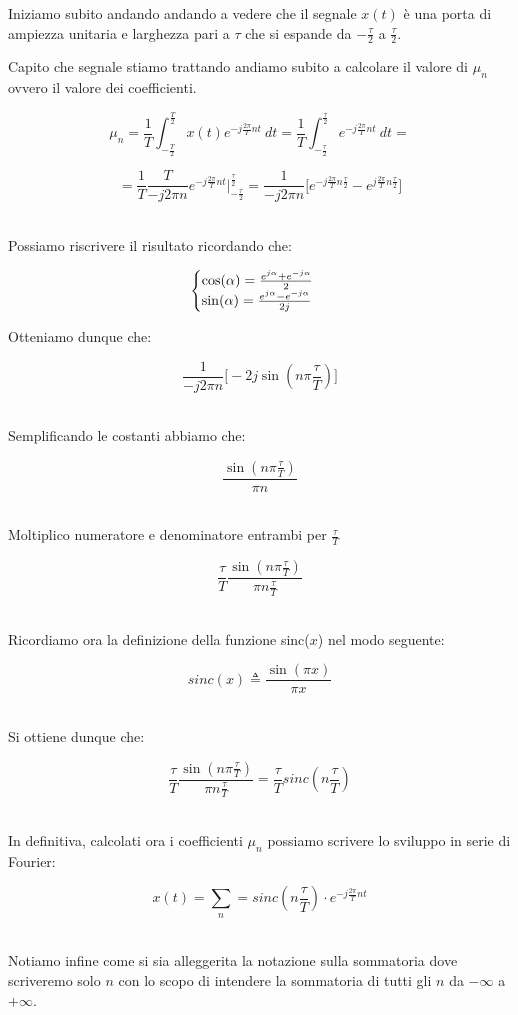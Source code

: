 \documentclass[../main.tex]{subfiles}
\begin{document}
Iniziamo subito andando andando a vedere che il segnale $x(t)$ è una porta di ampiezza unitaria e larghezza pari a $\tau$ che si espande da $-\frac{\tau}{2}$ a $\frac{\tau}{2}$.

Capito che segnale stiamo trattando andiamo subito a calcolare il valore di $\mu_n$ ovvero il valore dei coefficienti.

\[ \mu_n = \frac{1}{T} \int_{-\frac{T}{2}}^{\frac{T}{2}} x(t) e^{-j\frac{2\pi}{T}nt}\: dt =  \frac{1}{T} \int_{-\frac{\tau}{2}}^{\frac{\tau}{2}} e^{-j\frac{2\pi}{T}nt}\: dt = \]

\[ =  \frac{1}{T} \frac{T}{-j2\pi n} e^{-j\frac{2\pi}{T}nt} \bigg|_{-\frac{\tau}{2}}^{\frac{\tau}{2}} = \frac{1}{-j 2 \pi n} \big[ e^{-j\frac{2\pi}{T}n\frac{\tau}{2}} - e ^{j\frac{2\pi}{T}n\frac{\tau}{2}} \big]  \]\

Possiamo riscrivere il risultato ricordando che:

\[ \begin{cases}
	$$ \cos(\alpha) = \frac{e^{j\alpha} + e^{-j\alpha}}{2} $$ \\
	$$ \sin(\alpha) = \frac{e^{j\alpha} - e^{-j\alpha}}{2j} $$ 
\end{cases}	 \]

Otteniamo dunque che:

\[ \frac{1}{-j 2 \pi n} \big[ -2j\sin(n\pi \frac{\tau}{T}) \big] \]\

Semplificando le costanti abbiamo che:

\[ \frac{\sin(n\pi \frac{\tau}{T})}{\pi n} \]\

Moltiplico numeratore e denominatore entrambi per $\frac{\tau}{T}$


\[ \frac{\tau}{T}\frac{\sin(n\pi \frac{\tau}{T})}{\pi n \frac{\tau}{T}} \]\

Ricordiamo ora la definizione della funzione sinc($x$) nel modo seguente:

\[\unit{sinc}(x) \triangleq \frac{\sin(\pi x)}{\pi x} \]\

Si ottiene dunque che:

\[ \frac{\tau}{T}\frac{\sin(n\pi \frac{\tau}{T})}{\pi n \frac{\tau}{T}} = \frac{\tau}{T}\unit{sinc}(n\frac{\tau}{T}) \]\

In definitiva, calcolati ora i coefficienti $\mu_n$ possiamo scrivere lo sviluppo in serie di Fourier:

\[ x(t) = \sum_n = \unit{sinc}(n\frac{\tau}{T}) \cdot e^{-j\frac{2\pi}{T}nt} \]\

Notiamo infine come si sia alleggerita la notazione sulla sommatoria dove scriveremo solo $n$ con lo scopo di intendere la sommatoria di tutti gli $n$ da $-\infty$ a $+ \infty$.
\end{document}
